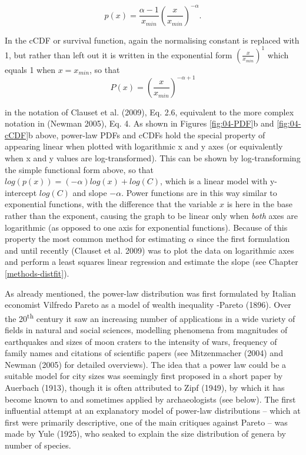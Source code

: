 \documentclass[
  12pt,
]{book}
\begin{document}
\begin{equation}
p(x) = \frac{\alpha-1}{x_{min}}(\frac{x}{x_{min}})^{-\alpha}.
\label{eq:power-law}
\end{equation}

In the cCDF or survival function, again the normalising constant is replaced with 1, but rather than left out it is written in the exponential form \((\frac{x}{x_{min}})^1\) which equals 1 when \(x = x_{min}\), so that\[P(x) = (\frac{x}{x_{min}})^{-\alpha+1}\]

in the notation of Clauset et al. (2009), Eq. 2.6, equivalent to the more complex notation in (Newman 2005), Eq. 4. As shown in Figures \ref{fig:04-PDF}b and \ref{fig:04-cCDF}b above, power-law PDFs and cCDFs hold the special property of appearing linear when plotted with logarithmic x and y axes (or equivalently when x and y values are log-transformed). This can be shown by log-transforming the simple functional form above, so that \(log(p(x))=(-\alpha)log(x)+log(C)\), which is a linear model with y-intercept \(log(C)\) and slope \(-\alpha\). Power functions are in this way similar to exponential functions, with the difference that the variable \(x\) is here in the base rather than the exponent, causing the graph to be linear only when \emph{both} axes are logarithmic (as opposed to one axis for exponential functions). Because of this property the most common method for estimating \(\alpha\) since the first formulation and until recently (Clauset et al. 2009) was to plot the data on logarithmic axes and perform a least squares linear regression and estimate the slope (see Chapter \ref{methods-distfit}).

As already mentioned, the power-law distribution was first formulated by Italian economist Vilfredo Pareto as a model of wealth inequality -Pareto (1896). Over the 20\textsuperscript{th} century it saw an increasing number of applications in a wide variety of fields in natural and social sciences, modelling phenomena from magnitudes of earthquakes and sizes of moon craters to the intensity of wars, frequency of family names and citations of scientific papers (see Mitzenmacher (2004) and Newman (2005) for detailed overviews). The idea that a power law could be a suitable model for city sizes was seemingly first proposed in a short paper by Auerbach (1913), though it is often attributed to Zipf (1949), by which it has become known to and sometimes applied by archaeologists (see below). The first influential attempt at an explanatory model of power-law distributions -- which at first were primarily descriptive, one of the main critiques against Pareto -- was made by Yule (1925), who seaked to explain the size distribution of genera by number of species.
\end{document}
